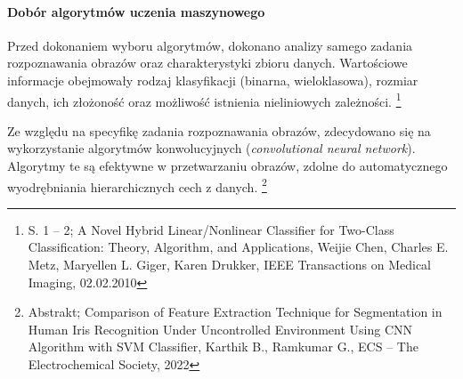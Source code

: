 \documentclass[12pt, a4paper, twoside, openany]{book}
\newcommand{\forceindent}{\leavevmode{\parindent=1.3em\indent}}
\begin{document}
{\paragraph{Dobór algorytmów uczenia maszynowego\\}
\forceindent Przed dokonaniem wyboru algorytmów, dokonano analizy samego zadania rozpoznawania obrazów oraz charakterystyki zbioru danych.
Wartościowe informacje obejmowały rodzaj klasyfikacji (binarna, wieloklasowa), rozmiar danych, ich złożoność oraz możliwość istnienia nieliniowych zależności. \footnote{ S. 1 -- 2; A Novel Hybrid Linear/Nonlinear Classifier for Two-Class Classification: Theory, Algorithm, and Applications, Weijie Chen, Charles E. Metz, Maryellen L. Giger, Karen Drukker, IEEE Transactions on Medical Imaging, 02.02.2010}

Ze względu na specyfikę zadania rozpoznawania obrazów, zdecydowano się na wykorzystanie algorytmów konwolucyjnych (\textit{convolutional neural network}).
Algorytmy te są efektywne w przetwarzaniu obrazów, zdolne do automatycznego wyodrębniania hierarchicznych cech z danych. \footnote{Abstrakt; Comparison of Feature Extraction Technique for Segmentation in Human Iris Recognition Under Uncontrolled Environment Using CNN Algorithm with SVM Classifier, Karthik B., Ramkumar G., ECS -- The Electrochemical Society, 2022}

}
\end{document}
